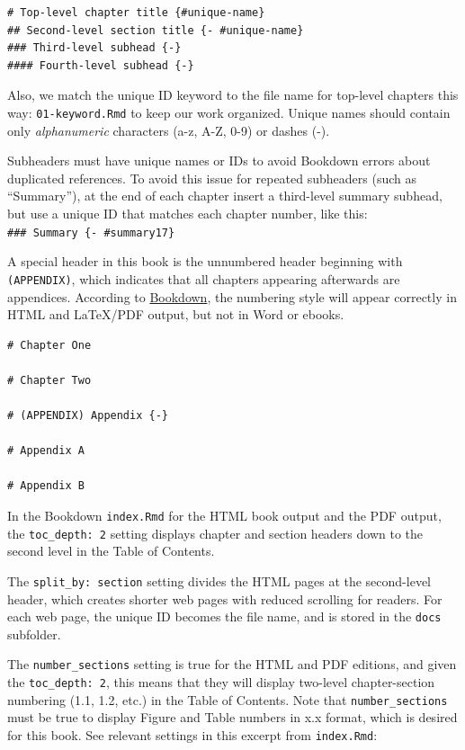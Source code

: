\documentclass[
  english,
]{book}
\begin{document}
\begin{verbatim}
# Top-level chapter title {#unique-name}
## Second-level section title {- #unique-name}
### Third-level subhead {-}
#### Fourth-level subhead {-}
\end{verbatim}

Also, we match the unique ID keyword to the file name for top-level chapters this way: \texttt{01-keyword.Rmd} to keep our work organized. Unique names should contain only \emph{alphanumeric} characters (a-z, A-Z, 0-9) or dashes (-).

Subheaders must have unique names or IDs to avoid Bookdown errors about duplicated references. To avoid this issue for repeated subheaders (such as ``Summary''), at the end of each chapter insert a third-level summary subhead, but use a unique ID that matches each chapter number, like this: \texttt{\#\#\#\ Summary\ \{-\ \#summary17\}}

A special header in this book is the unnumbered header beginning with \texttt{(APPENDIX)}, which indicates that all chapters appearing afterwards are appendices. According to \href{https://bookdown.org/yihui/bookdown/markdown-extensions-by-bookdown.html}{Bookdown}, the numbering style will appear correctly in HTML and LaTeX/PDF output, but not in Word or ebooks.

\begin{verbatim}
# Chapter One

# Chapter Two

# (APPENDIX) Appendix {-}

# Appendix A

# Appendix B
\end{verbatim}

In the Bookdown \texttt{index.Rmd} for the HTML book output and the PDF output, the \texttt{toc\_depth:\ 2} setting displays chapter and section headers down to the second level in the Table of Contents.

The \texttt{split\_by:\ section} setting divides the HTML pages at the second-level header, which creates shorter web pages with reduced scrolling for readers. For each web page, the unique ID becomes the file name, and is stored in the \texttt{docs} subfolder.

The \texttt{number\_sections} setting is true for the HTML and PDF editions, and given the \texttt{toc\_depth:\ 2}, this means that they will display two-level chapter-section numbering (1.1, 1.2, etc.) in the Table of Contents. Note that \texttt{number\_sections} must be true to display Figure and Table numbers in x.x format, which is desired for this book. See relevant settings in this excerpt from \texttt{index.Rmd}:
\end{document}
